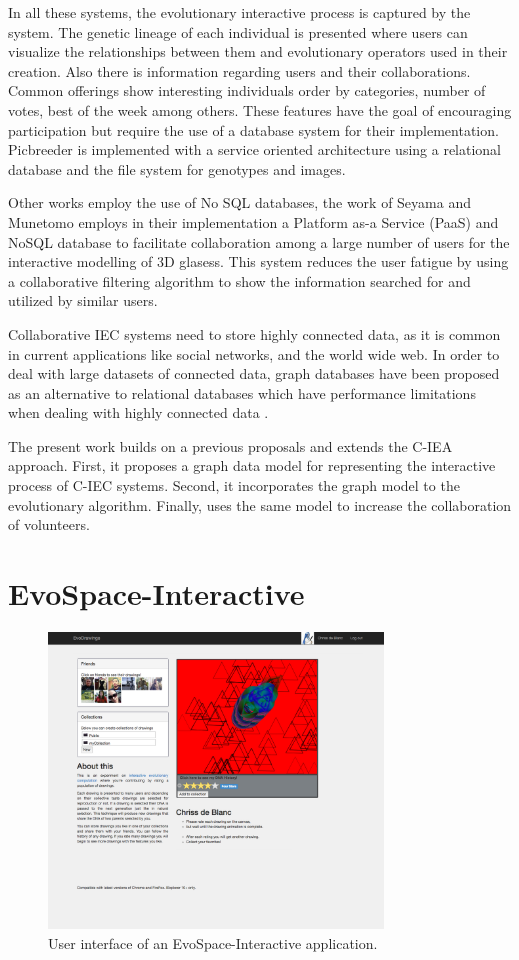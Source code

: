 \documentclass[conference]{IEEEtran}
\begin{document}
In all these systems, the evolutionary interactive process is captured by the system. The genetic lineage of each
individual is presented where users can visualize the relationships between them and evolutionary operators used in
their creation. Also there is information regarding users and their collaborations.  Common offerings show 
interesting individuals order by categories, number of votes, best of the week among others.
These features have the goal of encouraging participation but require the use of a database system 
for their implementation. Picbreeder \cite{picbreeder} is implemented with a service oriented
architecture using a relational database and the file system for genotypes and images. 

Other works employ the use of No SQL databases, the work of Seyama and Munetomo \cite{seyama2016development}
employs in their implementation a Platform as-a Service (PaaS) and NoSQL database to facilitate collaboration 
among a large number of users for the interactive modelling of 3D glasess.  This system reduces the user fatigue
by using a collaborative filtering algorithm to show the information searched for and utilized by similar users.


Collaborative IEC systems need to store highly connected data, as it is common in current applications
like social networks, and the world wide web. In order to deal with large datasets of connected data,
graph databases \cite{angles2012comparison} have been proposed as an alternative to relational databases 
which have performance limitations when dealing with highly connected data \cite{holzschuher2013performance}.

The present work builds on a previous proposals and extends the C-IEA approach.
First, it proposes a graph data model for representing the interactive process of C-IEC systems.
Second, it incorporates the graph model to the evolutionary algorithm.
Finally, uses the same model to increase the collaboration of volunteers.


\section{EvoSpace-Interactive}
\label{sec:evospace-i}
\begin{figure}[!t]
    \centering
        \includegraphics[width=3.5in]{img/UI_ed01.png}
    \caption{User interface of an EvoSpace-Interactive application.}
    \label{fig:web}
\end{figure}
\end{document}
